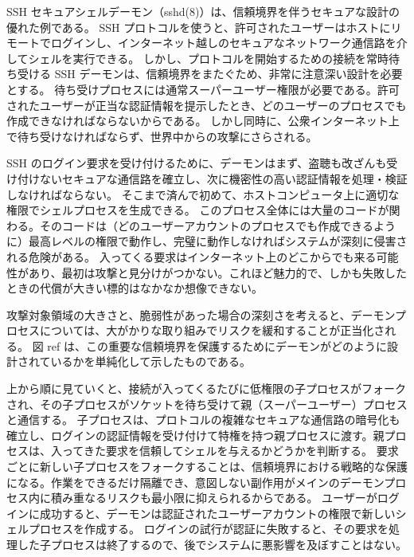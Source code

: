 \documentclass[uplatex]{jsarticle}
\def\ref#1{ref}%
\def\label#1{}%
\begin{document}
\begin{exa}\label{exa:ch2-sshd}
SSH セキュアシェルデーモン（sshd(8)）は、信頼境界を伴うセキュアな設計の優れた例である。
SSH プロトコルを使うと、許可されたユーザーはホストにリモートでログインし、インターネット越しのセキュアなネットワーク通信路を介してシェルを実行できる。
しかし、プロトコルを開始するための接続を常時待ち受ける SSH デーモンは、信頼境界をまたぐため、非常に注意深い設計を必要とする。
待ち受けプロセスには通常スーパーユーザー権限が必要である。許可されたユーザーが正当な認証情報を提示したとき、どのユーザーのプロセスでも作成できなければならないからである。
しかし同時に、公衆インターネット上で待ち受けなければならず、世界中からの攻撃にさらされる。

SSH のログイン要求を受け付けるために、デーモンはまず、盗聴も改ざんも受け付けないセキュアな通信路を確立し、次に機密性の高い認証情報を処理・検証しなければならない。
そこまで済んで初めて、ホストコンピュータ上に適切な権限でシェルプロセスを生成できる。
このプロセス全体には大量のコードが関わる。そのコードは（どのユーザーアカウントのプロセスでも作成できるように）最高レベルの権限で動作し、完璧に動作しなければシステムが深刻に侵害される危険がある。
入ってくる要求はインターネット上のどこからでも来る可能性があり、最初は攻撃と見分けがつかない。これほど魅力的で、しかも失敗したときの代償が大きい標的はなかなか想像できない。

攻撃対象領域の大きさと、脆弱性があった場合の深刻さを考えると、デーモンプロセスについては、大がかりな取り組みでリスクを緩和することが正当化される。
図 \ref{fig:ch2-sshd} は、この重要な信頼境界を保護するためにデーモンがどのように設計されているかを単純化して示したものである。

上から順に見ていくと、接続が入ってくるたびに低権限の子プロセスがフォークされ、その子プロセスがソケットを待ち受けて親（スーパーユーザー）プロセスと通信する。
子プロセスは、プロトコルの複雑なセキュアな通信路の暗号化も確立し、ログインの認証情報を受け付けて特権を持つ親プロセスに渡す。親プロセスは、入ってきた要求を信頼してシェルを与えるかどうかを判断する。
要求ごとに新しい子プロセスをフォークすることは、信頼境界における戦略的な保護になる。作業をできるだけ隔離でき、意図しない副作用がメインのデーモンプロセス内に積み重なるリスクも最小限に抑えられるからである。
ユーザーがログインに成功すると、デーモンは認証されたユーザーアカウントの権限で新しいシェルプロセスを作成する。
ログインの試行が認証に失敗すると、その要求を処理した子プロセスは終了するので、後でシステムに悪影響を及ぼすことはない。
\end{exa}
\end{document}
